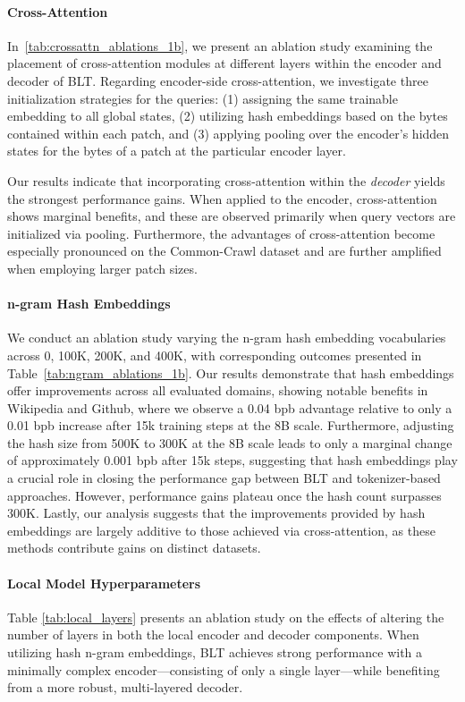 \paragraph{Cross-Attention} 
In~\autoref{tab:crossattn_ablations_1b}, we present an ablation study examining the placement of cross-attention modules at different layers within the encoder and decoder of {\textsc BLT}. Regarding encoder-side cross-attention, we investigate three initialization strategies for the queries: (1) assigning the same trainable embedding to all global states, (2) utilizing hash embeddings based on the bytes contained within each patch, and (3) applying pooling over the encoder’s hidden states for the bytes of a patch at the particular encoder layer.

Our results indicate that incorporating cross-attention within the \textit{decoder} yields the strongest performance gains. When applied to the encoder, cross-attention shows marginal benefits, and these are observed primarily when query vectors are initialized via pooling. Furthermore, the advantages of cross-attention become especially pronounced on the Common-Crawl dataset and are further amplified when employing larger patch sizes.

\paragraph{n-gram Hash Embeddings} 

We conduct an ablation study varying the n-gram hash embedding vocabularies across 0, 100K, 200K, and 400K, with corresponding outcomes presented in Table~\ref{tab:ngram_ablations_1b}. Our results demonstrate that hash embeddings offer improvements across all evaluated domains, showing notable benefits in Wikipedia and Github, where we observe a 0.04 bpb advantage relative to only a 0.01 bpb increase after 15k training steps at the 8B scale. Furthermore, adjusting the hash size from 500K to 300K at the 8B scale leads to only a marginal change of approximately 0.001 bpb after 15k steps, suggesting that hash embeddings play a crucial role in closing the performance gap between {\textsc BLT} and tokenizer-based approaches. However, performance gains plateau once the hash count surpasses 300K. Lastly, our analysis suggests that the improvements provided by hash embeddings are largely additive to those achieved via cross-attention, as these methods contribute gains on distinct datasets.

\paragraph{Local Model Hyperparameters} Table \ref{tab:local_layers} presents an ablation study on the effects of altering the number of layers in both the local encoder and decoder components. When utilizing hash n-gram embeddings, {\textsc BLT} achieves strong performance with a minimally complex encoder—consisting of only a single layer—while benefiting from a more robust, multi-layered decoder.

